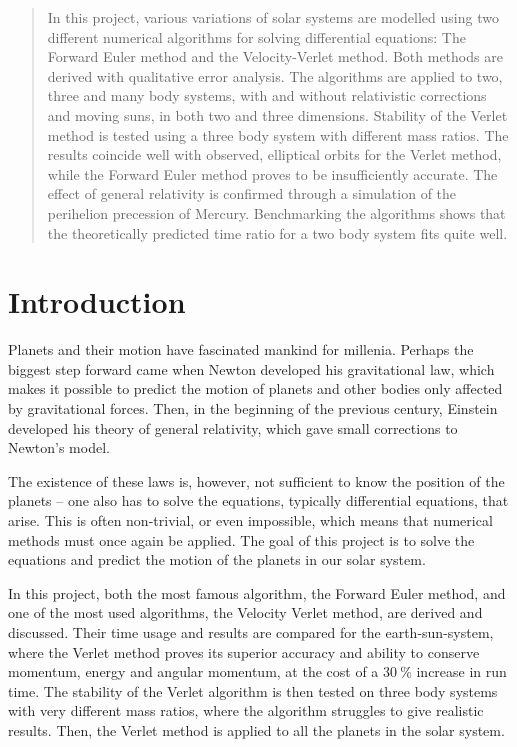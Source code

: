 \documentclass[12pt,english,a4paper]{article}
\begin{document}

\pagestyle{fancy}
\tableofcontents

%

\begin{abstract}
In this project, various variations of solar systems are modelled using two different numerical algorithms for solving differential equations: The Forward Euler method and the Velocity-Verlet method. Both methods are derived with qualitative error analysis. The algorithms are applied to two, three and many body systems, with and without relativistic corrections and moving suns, in both two and three dimensions. Stability of the Verlet method is tested using a three body system with different mass ratios. The results coincide well with observed, elliptical orbits for the Verlet method, while the Forward Euler method proves to be insufficiently accurate. The effect of general relativity is confirmed through a simulation of the perihelion precession of Mercury. Benchmarking the algorithms shows that the theoretically predicted time ratio for a two body system fits quite well.
\end{abstract}



\clearpage
\section{Introduction}
Planets and their motion have fascinated mankind for millenia. Perhaps the biggest step forward came when Newton developed his gravitational law, which makes it possible to predict the motion of planets and other bodies only affected by gravitational forces. Then, in the beginning of the previous century, Einstein developed his theory of general relativity, which gave small corrections to Newton's model.

The existence of these laws is, however, not sufficient to know the position of the planets -- one also has to solve the equations, typically differential equations, that arise. This is often non-trivial, or even impossible, which means that numerical methods must once again be applied. The goal of this project is to solve the equations and predict the motion of the planets in our solar system.

In this project, both the most famous algorithm, the Forward Euler method, and one of the most used algorithms, the Velocity Verlet method, are derived and discussed. Their time usage and results are compared for the earth-sun-system, where the Verlet method proves its superior accuracy and ability to conserve momentum, energy and angular momentum, at the cost of a \(\SI{30}{\percent}\) increase in run time. The stability of the Verlet algorithm is then tested on three body systems with very different mass ratios, where the algorithm struggles to give realistic results. Then, the Verlet method is applied to all the planets in the solar system.
\end{document}
